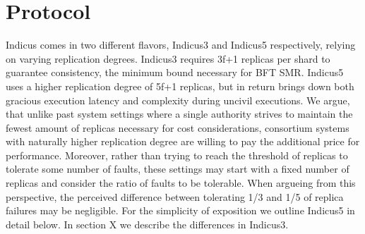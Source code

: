 %
%
%
%
%
%
%
%

\section{Protocol}
Indicus comes in two different flavors, Indicus3 and Indicus5 respectively, relying on varying replication degrees. Indicus3 requires 3f+1 replicas per shard to guarantee consistency, the minimum bound necessary for BFT SMR. Indicus5 uses a higher replication degree of 5f+1 replicas, but in return brings down both gracious execution latency and complexity during uncivil executions. We argue, that unlike past system settings where a single authority strives to maintain the fewest amount of replicas necessary for cost considerations, consortium systems with naturally higher replication degree are willing to pay the additional price for performance. Moreover, rather than trying to reach the threshold of replicas to tolerate some number of faults, these settings may start with a fixed number of replicas and consider the ratio of faults to be tolerable. When argueing from this perspective, the perceived difference between tolerating 1/3 and 1/5 of replica failures may be negligible.
For the simplicity of exposition we outline Indicus5 in detail below. In section X we describe the differences in Indicus3.


